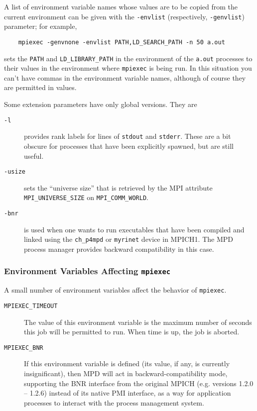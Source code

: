 \documentclass[dvipdfm,11pt]{article}
\begin{document}
A list of environment variable names whose values are
to be copied from the current environment can be given with the
\texttt{-envlist} (respectively, \texttt{-genvlist}) parameter; for example,
\begin{verbatim}
    mpiexec -genvnone -envlist PATH,LD_SEARCH_PATH -n 50 a.out
\end{verbatim}
sets the \texttt{PATH} and \texttt{LD\_LIBRARY\_PATH} in the environment
of the \texttt{a.out} processes to their values in the environment where
\texttt{mpiexec} is being run.  In this situation you can't have commas
in the environment variable names, although of course they are permitted
in values.

Some extension parameters have only global versions.  They are
\begin{description}
\item[\texttt{-l}] provides rank labels for lines of \texttt{stdout} and
  \texttt{stderr}.  These are a bit obscure for processes that have
  been explicitly spawned, but are still useful.
\item[\texttt{-usize}] sets the ``universe size'' that is retrieved by the MPI
  attribute \\
\texttt{MPI\_UNIVERSE\_SIZE} on \texttt{MPI\_COMM\_WORLD}. 
\item[\texttt{-bnr}] is used when one wants to run executables that have
  been compiled and linked using the \texttt{ch\_p4mpd} or
  \texttt{myrinet} device in MPICH1.  The MPD process manager provides
  backward compatibility in this case.
\end{description}


\subsubsection{Environment Variables Affecting \texttt{mpiexec}}
\label{sec:mpd-mpiexec-env}

A small number of environment variables affect the behavior of
\texttt{mpiexec}. 

\begin{description}
\item[\texttt{MPIEXEC\_TIMEOUT}] The value of this environment variable is the
  maximum number of seconds this job will be permitted to run.  When
  time is up, the job is aborted. 
\item[\texttt{MPIEXEC\_BNR}] If this environment variable is defined
  (its value, if any, is currently insignificant), then MPD will act in
  backward-compatibility mode, supporting the BNR interface from the
  original MPICH (e.g. versions 1.2.0 -- 1.2.6)
  instead of its native PMI interface, as a way for application
  processes to interact with the process management system.
\end{description}
\end{document}
